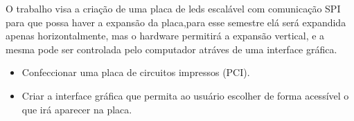 O trabalho visa a criação de uma placa de leds escalável com comunicação SPI para que possa haver a expansão da placa,para esse semestre elá será expandida apenas horizontalmente, mas o hardware permitirá a expansão vertical, e a mesma pode ser controlada pelo computador atráves de uma interface gráfica.
		
		\begin{itemize}
			\item Confeccionar uma placa de circuitos impressos (PCI).
			
			\item Criar a interface gráfica que permita ao usuário escolher de forma acessível o que irá aparecer na placa.


		\end{itemize}

